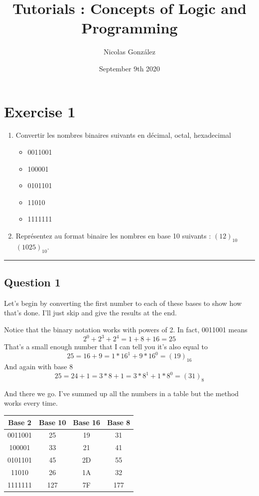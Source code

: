 \documentclass[a4paper,10pt]{article}
\title{Tutorials : Concepts of Logic and Programming}
\author{Nicolas González}
\date{September 9th 2020}
\def\centralruler{\begin{center}\rule{5cm}{.1pt}\end{center}}
\begin{document}
\maketitle

\newpage

\section{Exercise 1}
\begin{enumerate}
	\item Convertir les nombres binaires suivants en décimal, octal, hexadecimal
	\begin{itemize}
		\item 0011001
		\item 100001
		\item 0101101
		\item 11010
		\item 1111111
	\end{itemize}
	\item Représentez au format binaire les nombres en base 10 suivants : $(12)_{10}$ $(1025)_{10}$.
\end{enumerate}
\centralruler

\subsection{Question 1}

Let's begin by converting the first number to each of these bases to show how that's done. I'll just skip and give the results at the end.

Notice that the binary notation works with powers of 2. In fact, 0011001 means
$$2^0+2^3+2^4=1+8+16=25$$
That's a small enough number that I can tell you it's also equal to
$$25=16 + 9 = 1*16^1 + 9 * 16^0 = (19)_{16}$$
And again with base $8$
$$25=24+1 = 3*8+1 = 3*8^1+1*8^0=(31)_{8}$$

And there we go. I've summed up all the numbers in a table but the method works every time.

\begin{center}
	\begin{tabular}{|c|c|c|c|}
		\hline
		Base 2&Base 10&Base 16&Base 8\\\hline
		0011001&25&19&31\\\hline
		100001&33&21&41\\\hline
		0101101&45&2D&55\\\hline
		11010&26&1A&32\\\hline
		1111111&127&7F&177\\\hline
	\end{tabular}
\end{center}
\end{document}
